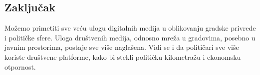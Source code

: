 \documentclass[a0,portrait]{a0poster}
\begin{document}
\begin{multicols}{2}
\color{teal}

\section*{\huge{Zaključak}}

\Large{
Možemo primetiti sve veću ulogu digitalnih medija u
oblikovanju gradske privrede i političke sfere. Uloga društvenih medija, odnosno mreža u gradovima, posebno u javnim prostorima, postaje sve više naglašena. Vidi se i da političari sve više koriste društvene platforme, kako bi stekli političku kilometražu i ekonomsku otpornost.
}

\end{multicols}
\end{document}
